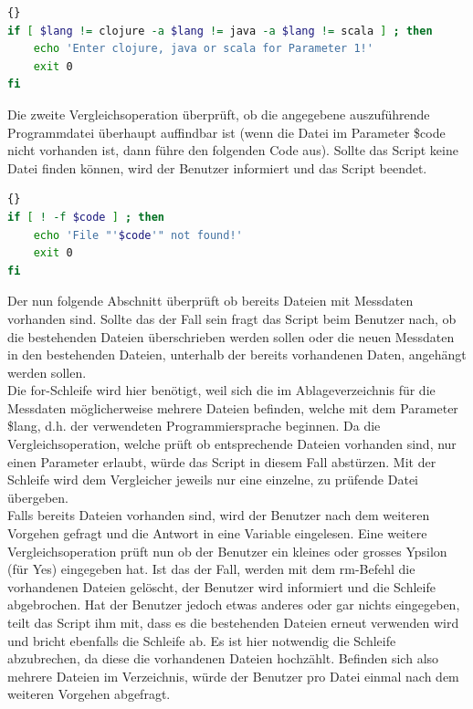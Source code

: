 \documentclass{fancydocument}
\begin{document}
\begin{minipage}{\textwidth}
\begin{lstlisting}[language=bash,caption=Sprachparameter prüfen]{}
if [ $lang != clojure -a $lang != java -a $lang != scala ] ; then
	echo 'Enter clojure, java or scala for Parameter 1!'
	exit 0
fi
\end{lstlisting}
\end{minipage}

Die zweite Vergleichsoperation überprüft, ob die angegebene auszuführende Programmdatei überhaupt auffindbar ist (wenn die Datei im Parameter \$code nicht vorhanden ist, dann führe den folgenden Code aus). Sollte das Script keine Datei finden können, wird der Benutzer informiert und das Script beendet.

\begin{minipage}{\textwidth}
\begin{lstlisting}[language=bash,caption=Jar-Datei prüfen]{}
if [ ! -f $code ] ; then
	echo 'File "'$code'" not found!'
	exit 0
fi
\end{lstlisting}
\end{minipage}

Der nun folgende Abschnitt überprüft ob bereits Dateien mit Messdaten vorhanden sind. Sollte das der Fall sein fragt das Script beim Benutzer nach, ob die bestehenden Dateien überschrieben werden sollen oder die neuen Messdaten in den bestehenden Dateien, unterhalb der bereits vorhandenen Daten, angehängt werden sollen.
\\
Die for-Schleife wird hier benötigt, weil sich die im Ablageverzeichnis für die Messdaten möglicherweise mehrere Dateien befinden, welche mit dem Parameter \$lang, d.h. der verwendeten Programmiersprache beginnen.  Da die Vergleichsoperation, welche prüft ob entsprechende Dateien vorhanden sind, nur einen Parameter erlaubt, würde das Script in diesem Fall abstürzen. Mit der Schleife wird dem Vergleicher jeweils nur eine einzelne, zu prüfende Datei übergeben.
\\
Falls bereits Dateien vorhanden sind, wird der Benutzer nach dem weiteren Vorgehen gefragt und die Antwort in eine Variable eingelesen. Eine weitere Vergleichsoperation prüft nun ob der Benutzer ein kleines oder grosses Ypsilon (für Yes) eingegeben hat. Ist das der Fall, werden mit dem rm-Befehl die vorhandenen Dateien gelöscht, der Benutzer wird informiert und die Schleife abgebrochen. Hat der Benutzer jedoch etwas anderes oder gar nichts eingegeben, teilt das Script ihm mit, dass es die bestehenden Dateien erneut verwenden wird und bricht ebenfalls die Schleife ab. Es ist hier notwendig die Schleife abzubrechen, da diese die vorhandenen Dateien hochzählt.  Befinden sich also mehrere Dateien im Verzeichnis, würde der Benutzer pro Datei einmal nach dem weiteren Vorgehen abgefragt.
\end{document}
